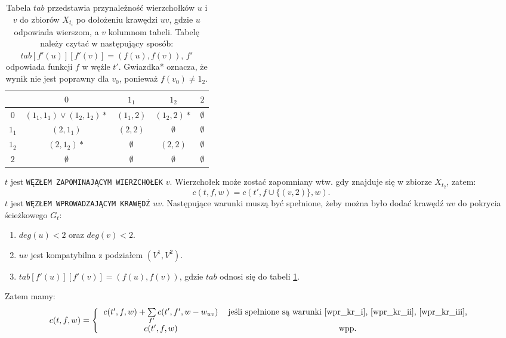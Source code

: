 \documentclass[12pt, oneside]{report}
\begin{document}
\begin{table}
\centering
\begin{tabular}{c|c|c|c|c}
 & $0$ & $1_1$ & $1_2$ & $2$ \\
\hline
$0$ & $(1_1,1_1) \vee (1_2,1_2)*$ & $(1_1,2)$ & $(1_2,2)*$ & $\emptyset$ \\
\hline
$1_1$ & $(2,1_1)$ & $(2,2)$ & $\emptyset$ & $\emptyset$ \\
\hline
$1_2$ & $(2,1_2)*$ & $\emptyset$ & $(2,2)$ & $\emptyset$ \\
\hline
$2$ & $\emptyset$ & $\emptyset$ & $\emptyset$ & $\emptyset$ \\
\end{tabular}
\caption{Tabela $tab$ przedstawia przynależność wierzchołków $u$ i $v$ do zbiorów $X_{t_i}$ po dołożeniu krawędzi $uv$, gdzie $u$ odpowiada wierszom, a $v$ kolumnom tabeli. Tabelę należy czytać w następujący sposób: $tab[f'(u)][f'(v)] = (f(u), f(v))$, $f'$ odpowiada funkcji $f$ w węźle $t'$. Gwiazdka* oznacza, że wynik nie jest poprawny dla $v_0$, ponieważ $f(v_0) \neq 1_2$.}
\label{add_edge_table}
\end{table}
\noindent$t$ jest \texttt{WĘZŁEM ZAPOMINAJĄCYM WIERZCHOŁEK} $v$. Wierzchołek może zostać zapomniany wtw. gdy znajduje się w zbiorze $X_{t_2}$, zatem:
$$c(t,f,w) = c(t',f \cup \{(v,2)\},w).$$
\newline
$t$ jest \texttt{WĘZŁEM WPROWADZAJĄCYM KRAWĘDŹ} $uv$. Następujące warunki muszą być spełnione, żeby można było dodać krawędź $uv$ do pokrycia ścieżkowego $G_t$:
\begin{enumerate}[label=(\roman*)]
\item \label{wpr_kr_i}$deg(u) < 2$ oraz $deg(v) < 2$.
\item \label{wpr_kr_ii}$uv$ jest kompatybilna z podziałem $(V^1, V^2)$.
\item \label{wpr_kr_iii}$tab[f'(u)][f'(v)] = (f(u),f(v))$, gdzie $tab$ odnosi się do tabeli \ref{add_edge_table}.  
\end{enumerate}
Zatem mamy:
\[
c(t,f,w) =  
\left \{
  \begin{tabular}{ccc}
  $c(t',f,w) + \sum \limits_{f'} c(t',f',w - w_{uv})$ & jeśli spełnione są warunki \ref{wpr_kr_i}, \ref{wpr_kr_ii}, \ref{wpr_kr_iii},\\
  $c(t',f,w)$ &  wpp.
  \end{tabular}
\right. 
\]
\end{document}
